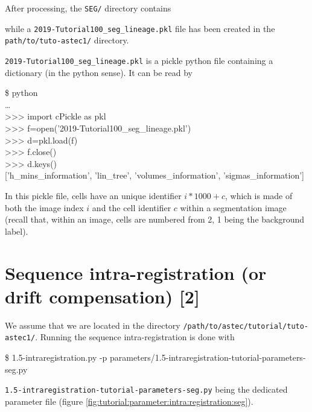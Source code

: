 After processing, the \texttt{SEG/} directory contains

\mbox{}
\mbox{}

while a \texttt{2019-Tutorial100\_seg\_lineage.pkl} file has been
created in the \texttt{path/to/tuto-astec1/} directory.

\mbox{}
\mbox{}

\texttt{2019-Tutorial100\_seg\_lineage.pkl} is a pickle python file
containing a dictionary (in the python sense). It can be read by
\begin{code}{0.8}
  \$ python \\
  \ldots \\
  >>> import cPickle as pkl \\
  >>> f=open('2019-Tutorial100\_seg\_lineage.pkl') \\
  >>> d=pkl.load(f) \\
  >>> f.close()  \\
  >>> d.keys() \\{}
  ['h\_mins\_information', 'lin\_tree', 'volumes\_information', 'sigmas\_information']
\end{code}
In this pickle file, cells have an unique identifier $i * 1000 + c$, which is made of
both the image index $i$ and the cell identifier $c$ within a segmentation
image (recall that, within an image, cells are numbered from 2, 1 being the background
label).



\section{Sequence intra-registration (or drift compensation) [2]}
\label{sec:tutorial:intra:registration:seg}

We assume that we are located in the directory
\texttt{/path/to/astec/tutorial/tuto-astec1/}. Running the sequence intra-registration is
done with
\begin{code}{0.8}
  \$ 1.5-intraregistration.py -p parameters/1.5-intraregistration-tutorial-parameters-seg.py 
\end{code}
\texttt{1.5-intraregistration-tutorial-parameters-seg.py} being the
dedicated parameter file  (figure \ref{fig:tutorial:parameter:intra:registration:seg}).

